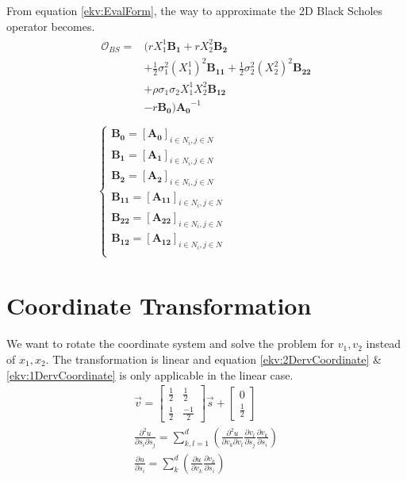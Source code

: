 \documentclass[a4paper]{article}      %
\begin{document}
From equation \ref{ekv:EvalForm}, the way to approximate the 2D Black Scholes operator becomes.
\begin{gather}
\begin{aligned}
 \mathcal{O}_{BS} =& ( rX_1^1 \mathbf{B_1} + rX_2^2 \mathbf{B_2} \\
&+ \frac{1}{2} \sigma_1^2 (X_1^1)^2 \mathbf{B_{11}} 
+ \frac{1}{2} \sigma_2^2 (X_2^2)^2 \mathbf{B_{22}} \\
&+ \rho \sigma_1 \sigma_2 X_1^1 X_2^2 \mathbf{B_{12}} \\
& - r\mathbf{B_0} ) \mathbf{A_0}^{-1} \\
\end{aligned}
\\
\begin{cases}
\mathbf{B_0} = [\mathbf{A_0}]_{i\in N_{i},j \in N} \\
\mathbf{B_1} = [\mathbf{A_1}]_{i\in N_{i},j \in N} \\
\mathbf{B_2} = [\mathbf{A_2}]_{i\in N_{i},j \in N} \\
\mathbf{B_{11}} = [\mathbf{A_{11}}]_{i\in N_{i},j \in N} \\
\mathbf{B_{22}} = [\mathbf{A_{22}}]_{i\in N_{i},j \in N} \\
\mathbf{B_{12}} = [\mathbf{A_{12}}]_{i\in N_{i},j \in N} \\
\end{cases}
\end{gather}
\section*{Coordinate Transformation}
We want to rotate the coordinate system and solve the problem for $v_1, v_2$ instead of  $x_1, x_2$. The transformation is linear and equation \ref{ekv:2DervCoordinate} \& \ref{ekv:1DervCoordinate} is only applicable in the linear case. 
\begin{gather}
\vec{v} =
\begin{bmatrix}
\frac{1}{2} & \frac{1}{2} \\ \frac{1}{2} & \frac{-1}{2}
\end{bmatrix}
\vec{s} +
\begin{bmatrix}
0 \\ \frac{1}{2}
\end{bmatrix} \\
\frac{\partial^2 u}{\partial {s_i}\partial {s_j}} =
\sum_{k,l = 1}^d 
\left( 
\frac{\partial^2 u}{\partial {v_k}\partial {v_l}}
\frac{\partial v_l}{\partial {s_j}}
\frac{\partial v_k}{\partial {s_i}}
\right) \label{ekv:2DervCoordinate}\\
\frac{\partial u}{\partial s_i}
= \sum_k^d
\left(
\frac{\partial u}{\partial v_k}
\frac{\partial v_k}{\partial s_i}
\right) \label{ekv:1DervCoordinate}
\end{gather}
\end{document}
